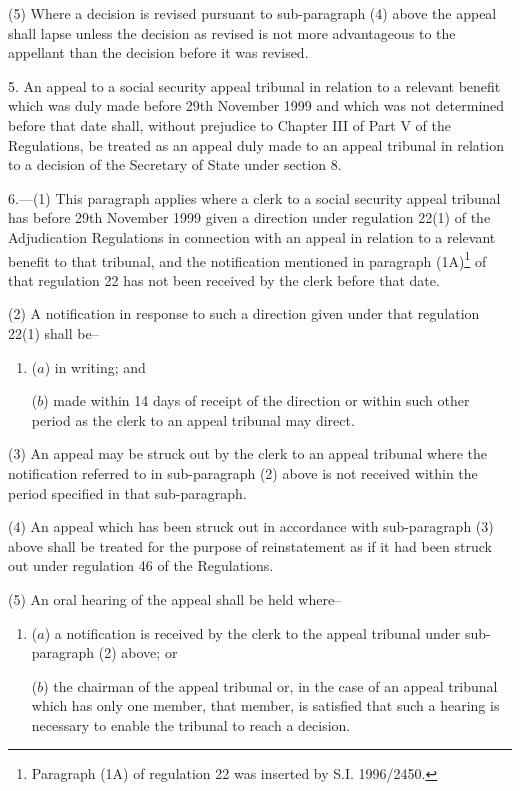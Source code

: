 \documentclass[12pt,a4paper]{article}
\begin{document}
(5) Where a decision is revised pursuant to sub-paragraph (4) above the appeal shall lapse unless the decision as revised is not more advantageous to the appellant than the decision before it was revised.

\medskip

5.  An appeal to a social security appeal tribunal in relation to a relevant benefit which was duly made before 29th November 1999 and which was not determined before that date shall, without prejudice to Chapter III of Part V of the Regulations, be treated as an appeal duly made to an appeal tribunal in relation to a decision of the Secretary of State under section 8.

\medskip

6.---(1)  This paragraph applies where a clerk to a social security appeal tribunal has before 29th November 1999 given a direction under regulation 22(1) of the Adjudication Regulations in connection with an appeal in relation to a relevant benefit to that tribunal, and the notification mentioned in paragraph (1A)\footnote{\frenchspacing Paragraph (1A) of regulation 22 was inserted by S.I. 1996/2450.} of that regulation 22 has not been received by the clerk before that date.

(2) A notification in response to such a direction given under that regulation 22(1) shall be–
\begin{enumerate}\item[]
($a$) in writing; and

($b$) made within 14 days of receipt of the direction or within such other period as the clerk to an appeal tribunal may direct.
\end{enumerate}

(3) An appeal may be struck out by the clerk to an appeal tribunal where the notification referred to in sub-paragraph (2) above is not received within the period specified in that sub-paragraph.

(4) An appeal which has been struck out in accordance with sub-paragraph (3) above shall be treated for the purpose of reinstatement as if it had been struck out under regulation 46 of the Regulations.

(5) An oral hearing of the appeal shall be held where–
\begin{enumerate}\item[]
($a$) a notification is received by the clerk to the appeal tribunal under sub-paragraph (2) above; or

($b$) the chairman of the appeal tribunal or, in the case of an appeal tribunal which has only one member, that member, is satisfied that such a hearing is necessary to enable the tribunal to reach a decision.
\end{enumerate}
\end{document}
